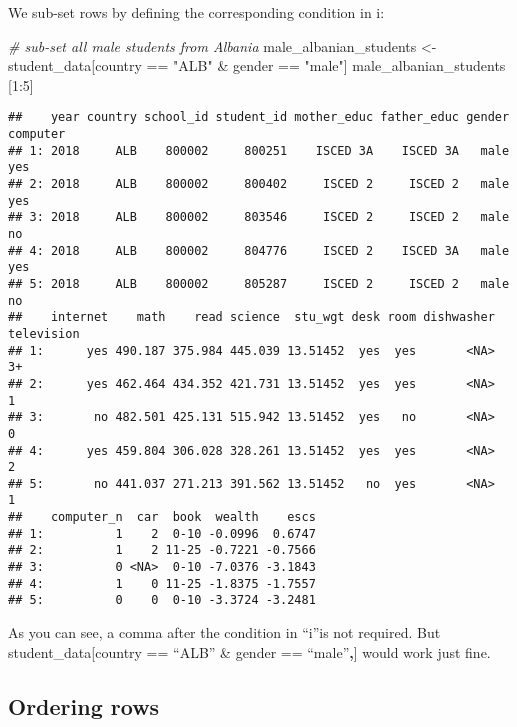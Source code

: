 \documentclass[
]{article}
\newenvironment{Shaded}{\begin{snugshade}}{\end{snugshade}}
\newcommand{\CommentTok}[1]{\textcolor[rgb]{0.56,0.35,0.01}{\textit{#1}}}
\newcommand{\DecValTok}[1]{\textcolor[rgb]{0.00,0.00,0.81}{#1}}
\newcommand{\NormalTok}[1]{#1}
\newcommand{\OtherTok}[1]{\textcolor[rgb]{0.56,0.35,0.01}{#1}}
\newcommand{\SpecialCharTok}[1]{\textcolor[rgb]{0.00,0.00,0.00}{#1}}
\newcommand{\StringTok}[1]{\textcolor[rgb]{0.31,0.60,0.02}{#1}}
\begin{document}
We sub-set rows by defining the corresponding condition in i:

\begin{Shaded}
\begin{Highlighting}[]
\CommentTok{\# sub{-}set all male students from Albania}
\NormalTok{male\_albanian\_students }\OtherTok{\textless{}{-}}\NormalTok{ student\_data[country }\SpecialCharTok{==} \StringTok{"ALB"} \SpecialCharTok{\&}\NormalTok{ gender }\SpecialCharTok{==} \StringTok{"male"}\NormalTok{]}
\NormalTok{male\_albanian\_students [}\DecValTok{1}\SpecialCharTok{:}\DecValTok{5}\NormalTok{]}
\end{Highlighting}
\end{Shaded}

\begin{verbatim}
##    year country school_id student_id mother_educ father_educ gender computer
## 1: 2018     ALB    800002     800251    ISCED 3A    ISCED 3A   male      yes
## 2: 2018     ALB    800002     800402     ISCED 2     ISCED 2   male      yes
## 3: 2018     ALB    800002     803546     ISCED 2     ISCED 2   male       no
## 4: 2018     ALB    800002     804776     ISCED 2    ISCED 3A   male      yes
## 5: 2018     ALB    800002     805287     ISCED 2     ISCED 2   male       no
##    internet    math    read science  stu_wgt desk room dishwasher television
## 1:      yes 490.187 375.984 445.039 13.51452  yes  yes       <NA>         3+
## 2:      yes 462.464 434.352 421.731 13.51452  yes  yes       <NA>          1
## 3:       no 482.501 425.131 515.942 13.51452  yes   no       <NA>          0
## 4:      yes 459.804 306.028 328.261 13.51452  yes  yes       <NA>          2
## 5:       no 441.037 271.213 391.562 13.51452   no  yes       <NA>          1
##    computer_n  car  book  wealth    escs
## 1:          1    2  0-10 -0.0996  0.6747
## 2:          1    2 11-25 -0.7221 -0.7566
## 3:          0 <NA>  0-10 -7.0376 -3.1843
## 4:          1    0 11-25 -1.8375 -1.7557
## 5:          0    0  0-10 -3.3724 -3.2481
\end{verbatim}

As you can see, a comma after the condition in ``i''is not required. But
student\_data{[}country == ``ALB'' \& gender == ``male''\textbf{,}{]}
would work just fine.

\hypertarget{ordering-rows}{%
\subsection{Ordering rows}\label{ordering-rows}}
\end{document}
